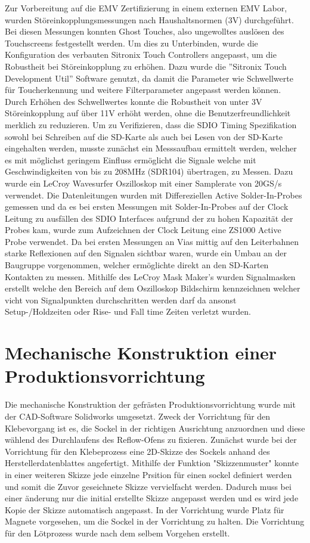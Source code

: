\documentclass[praktikum,german]{hgbthesis}
\begin{document}
Zur Vorbereitung auf die EMV Zertifizierung in einem externen EMV Labor, wurden Störeinkopplungsmessungen nach Haushaltsnormen (3V) durchgeführt. Bei diesen Messungen konnten Ghost Touches, also ungewolltes auslösen des Touchscreens festgestellt werden. Um dies zu Unterbinden, wurde die Konfiguration des verbauten Sitronix Touch Controllers angepasst, um die Robustheit bei Störeinkopplung zu erhöhen. Dazu wurde die ''Sitronix Touch Development Util'' Software genutzt, da damit die Parameter wie Schwellwerte für Toucherkennung und weitere Filterparameter angepasst werden können. Durch Erhöhen des Schwellwertes konnte die Robustheit von unter 3V Störeinkopplung auf über 11V erhöht werden, ohne die Benutzerfreundlichkeit merklich zu reduzieren.
Um zu Verifizieren, dass die SDIO Timing Spezifikation sowohl bei Schreiben auf die SD-Karte als auch bei Lesen von der SD-Karte eingehalten werden, musste zunächst ein Messsaufbau ermittelt werden, welcher es mit möglichst geringem Einfluss ermöglicht die Signale welche mit Geschwindigkeiten von bis zu 208MHz (SDR104) übertragen, zu Messen. Dazu wurde ein LeCroy Wavesurfer Oszilloskop mit einer Samplerate von 20GS/s verwendet. Die Datenleitungen wurden mit Differeziellen Active Solder-In-Probes gemessen und da es bei ersten Messungen mit Solder-In-Probes auf der Clock Leitung zu ausfällen des SDIO Interfaces aufgrund der zu hohen Kapazität der Probes kam, wurde zum Aufzeichnen der Clock Leitung eine ZS1000 Active Probe verwendet. Da bei ersten Messungen an Vias mittig auf den Leiterbahnen starke Reflexionen auf den Signalen sichtbar waren, wurde ein Umbau an der Baugruppe vorgenommen, welcher ermöglichte direkt an den SD-Karten Kontakten zu messen.
Mithilfe des LeCroy Mask Maker's wurden Signalmasken erstellt welche den Bereich auf dem Oszilloskop Bildschirm kennzeichnen welcher vicht von Signalpunkten durchschritten werden darf da ansonst Setup-/Holdzeiten oder Rise- und Fall time Zeiten verletzt wurden.

\section{Mechanische Konstruktion einer Produktionsvorrichtung}
Die mechanische Konstruktion der gefrästen Produktionsvorrichtung wurde mit der CAD-Software Solidworks umgesetzt. Zweck der Vorrichtung für den Klebevorgang ist es, die Sockel in der richtigen Ausrichtung anzuordnen und diese wählend des Durchlaufens des Reflow-Ofens zu fixieren. Zunächst wurde bei der Vorrichtung für den Klebeprozess eine 2D-Skizze des Sockels anhand des Herstellerdatenblattes angefertigt. Mithilfe der Funktion "Skizzenmuster" konnte in einer weiteren Skizze jede einzelne Prsition für einen sockel definiert werden und somit die Zuvor geseichnete Skizze vervielfacht werden. Dadurch muss bei einer änderung nur die initial erstellte Skizze angepasst werden und es wird jede Kopie der Skizze automatisch angepasst. In der Vorrichtung wurde Platz für Magnete vorgesehen, um die Sockel in der Vorrichtung zu halten. Die Vorrichtung für den Lötprozess wurde nach dem selbem Vorgehen erstellt.
\end{document}
